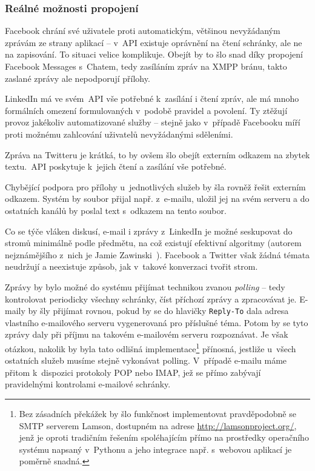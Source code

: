 \documentclass[12pt,oneside,final]{fithesis2}
\begin{document}
\subsubsection*{Reálné možnosti propojení}
Facebook chrání své uživatele proti automatickým, většinou nevyžádaným zprávám ze strany aplikací -- v~API existuje oprávnění na čtení schránky, ale ne na zapisování. To situaci velice komplikuje. Obejít by to šlo snad díky propojení Facebook Messages s~Chatem, tedy zasíláním zpráv na XMPP bránu, takto zaslané zprávy ale nepodporují přílohy.

LinkedIn má ve svém~API vše potřebné k~zasílání i čtení zpráv, ale má mnoho formálních omezení formulovaných v~podobě pravidel a povolení. Ty ztěžují provoz jakékoliv automatizované služby -- stejně jako v~případě Facebooku míří proti možnému zahlcování uživatelů nevyžádanými sděleními.

Zpráva na Twitteru je krátká, to by ovšem šlo obejít externím odkazem na zbytek textu.~API poskytuje k~jejich čtení a zasílání vše potřebné.

Chybějící podpora pro přílohy u~jednotlivých služeb by šla rovněž řešit externím odkazem. Systém by soubor přijal např. z~e-mailu, uložil jej na svém serveru a do ostatních kanálů by poslal text s~odkazem na tento soubor.

Co se týče vláken diskusí, e-mail i zprávy z~LinkedIn je možné seskupovat do stromů minimálně podle předmětu, na což existují efektivní algoritmy (autorem nejznámějšího z~nich je Jamie Zawinski~\cite{zawinski2002message}). Facebook a Twitter však žádná témata neudržují a neexistuje způsob, jak v~takové konverzaci tvořit strom.

Zprávy by bylo možné do systému přijímat technikou zvanou \emph{polling} -- tedy kontrolovat periodicky všechny schránky, číst příchozí zprávy a zpracovávat je. E-maily by šly přijímat rovnou, pokud by se do hlavičky {\tt Reply-To} dala adresa vlastního e-mailového serveru vygenerovaná pro příslušné téma. Potom by se tyto zprávy daly při příjmu na takovém e-mailovém serveru rozpoznávat. Je však otázkou, nakolik by byla tato odlišná implementace\footnote{Bez zásadních překážek by šlo funkčnost implementovat pravděpodobně se SMTP serverem Lamson, dostupném na adrese \url{http://lamsonproject.org/}, jenž je oproti tradičním řešením spoléhajícím přímo na prostředky operačního systému napsaný v~Pythonu a jeho integrace např. s~webovou aplikací je poměrně snadná.} přínosná, jestliže u~všech ostatních služeb musíme stejně vykonávat polling. V~případě e-mailu máme přitom k~dispozici protokoly POP nebo IMAP, jež se přímo zabývají pravidelnými kontrolami e-mailové schránky.
\end{document}
